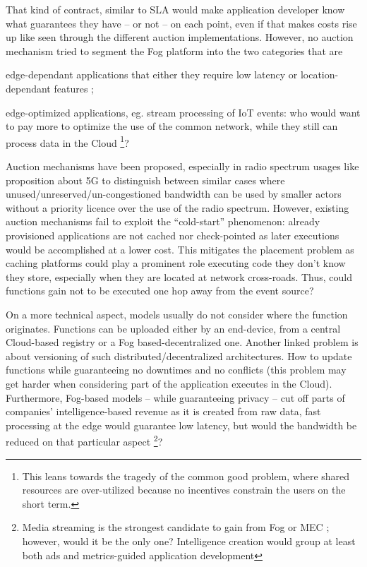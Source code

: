 \documentclass[11pt]{sdm}
\begin{document}
That kind of contract, similar to \gls{SLA} would make application developer know what guarantees they have -- or not -- on each point, even if that makes costs rise up like seen through the different auction implementations. However, no auction mechanism tried to segment the Fog platform into the two categories that are
\begin{enumerate*}[(A)]
	\item edge-dependant applications that either they require low latency or location-dependant features ;
	\item edge-optimized applications, eg. stream processing of \gls{IoT} events: who would want to pay more to optimize the use of the common network, while they still can process data in the Cloud \footnote{This leans towards the tragedy of the common good problem, where shared resources are over-utilized because no incentives constrain the users on the short term.}?
\end{enumerate*}
Auction mechanisms have been proposed, especially in radio spectrum usages like  proposition about 5G to distinguish between similar cases where unused/unreserved/un-congestioned bandwidth can be used by smaller actors without a priority licence over the use of the radio spectrum.
However, existing auction mechanisms fail to exploit the ``cold-start'' phenomenon: already provisioned applications are not cached nor check-pointed \cite{karhula_checkpointing_2019} as later executions would be accomplished at a lower cost. This mitigates the placement problem as caching platforms could play a prominent role executing code they don't know they store, especially when they are located at network cross-roads. Thus, could functions gain not to be executed one hop away from the event source?

On a more technical aspect, models usually do not consider where the function originates. Functions can be uploaded either by an end-device, from a central Cloud-based registry or a Fog based-decentralized one. Another linked problem is about versioning of such distributed/decentralized architectures. How to update functions while guaranteeing no downtimes and no conflicts (this problem may get harder when considering part of the application executes in the Cloud). Furthermore, Fog-based models -- while guaranteeing privacy -- cut off parts of companies' intelligence-based revenue as it is created from raw data, fast processing at the edge would guarantee low latency, but would the bandwidth be reduced on that particular aspect \footnote{Media streaming is the strongest candidate to gain from Fog or \gls{MEC} ; however, would it be the only one? Intelligence creation would group at least both ads and metrics-guided application development}?
\end{document}
